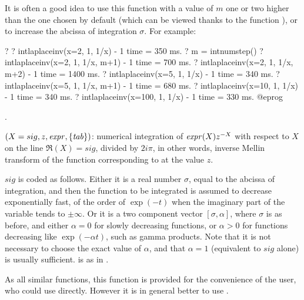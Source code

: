 It is often a good idea to use this function with a value of $m$ one or two
higher than the one chosen by default (which can be viewed thanks to the
function ), or to increase the abcissa of integration
$\sigma$. For example:

\bprog
? 
? intlaplaceinv(x=2, 1, 1/x) - 1
time = 350 ms.
? m = intnumstep()
? intlaplaceinv(x=2, 1, 1/x, m+1) - 1
time = 700 ms.
? intlaplaceinv(x=2, 1, 1/x, m+2) - 1
time = 1400 ms.
? intlaplaceinv(x=5, 1, 1/x) - 1
time = 340 ms.
? intlaplaceinv(x=5, 1, 1/x, m+1) - 1
time = 680 ms.
? intlaplaceinv(x=10, 1, 1/x) - 1
time = 340 ms.
? intlaplaceinv(x=100, 1, 1/x) - 1
time = 330 ms.
@eprog

.

$(X=sig,z,\hbox{\it expr\/},\{\hbox{\it tab\/}\})$: numerical
integration of $\hbox{\it expr\/}(X)z^{-X}$ with respect to $X$ on the line
$\Re(X)=sig$, divided by $2i\pi$, in other words, inverse Mellin transform of
the function corresponding to  at the value $z$.

$sig$ is coded as follows. Either it is a real number $\sigma$, equal to the
abcissa of integration, and then the function to be integrated is assumed to
decrease exponentially fast, of the order of $\exp(-t)$ when the imaginary
part of the variable tends to $\pm\infty$. Or it is a two component vector
$[\sigma,\alpha]$, where $\sigma$ is as before, and either $\alpha=0$ for
slowly decreasing functions, or $\alpha>0$ for functions decreasing like
$\exp(-\alpha t)$, such as gamma products. Note that it is not necessary to
choose the exact value of $\alpha$, and that $\alpha=1$ (equivalent to $sig$
alone) is usually sufficient.  is as in .

As all similar functions, this function is provided for the convenience of
the user, who could use  directly. However it is in general
better to use .

